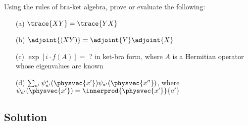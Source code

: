 Using the rules of bra-ket algebra, prove or evaluate the following:
\begin{itemize}
\item[(a)] $\trace{XY} = \trace{YX}$
\item[(b)] $\adjoint{(XY)} = \adjoint{Y}\adjoint{X}$
\item[(c)] $\exp{[i\cdot f(A)]} =$ ? in ket-bra form, where $A$ is a Hermitian
  operator whose eigenvalues are known
\item[(d)]$\sum_{a'}\psi_{a'}^*(\physvec{x'})\psi_{a'}(\physvec{x''})$, where
  $\psi_{a'}(\physvec{x'}) = \innerprod{\physvec{x'}}{a'}$
\end{itemize}

\subsection*{Solution}
